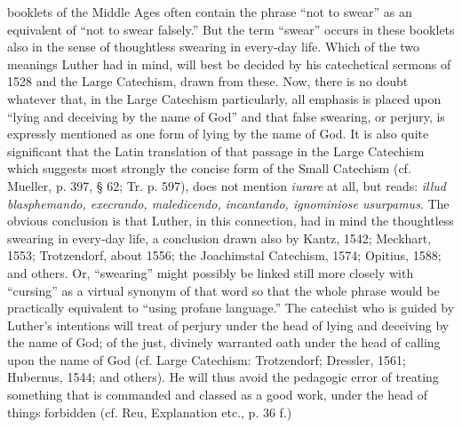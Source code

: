 booklets of the Middle Ages often contain the phrase “not to swear” as an equivalent of “not to swear falsely.” But the term “swear” occurs in these booklets also in the sense of thoughtless swearing in every-day life. Which of the two meanings Luther had in mind, will best be decided by his catechetical sermons of 1528 and the Large Catechism, drawn from these. Now, there is no doubt whatever that, in the Large Catechism particularly, all emphasis is placed upon “lying and deceiving by the name of God” and that false swearing, or perjury, is expressly mentioned as one form of lying by the name of God. It is also quite significant that the Latin translation of that passage in the Large Catechism which suggests most strongly the concise form of the Small Catechism (cf. Mueller, p. 397, § 62; Tr. p. 597), does not mention \emph{iurare} at all, but reads: \emph{illud blasphemando, execrando, maledicendo, incantando, ignominiose usurpamus}. The obvious conclusion is that Luther, in this connection, had in mind the thoughtless swearing in every-day life, a conclusion drawn also by Kantz, 1542; Meckhart, 1553; Trotzendorf, about 1556; the Joachimstal Catechism, 1574; Opitius, 1588; and others. Or, “swearing” might possibly be linked still more closely with “cursing” as a virtual synonym of that word so that the whole phrase would be practically equivalent to “using profane language.” The catechist who is guided by Luther’s intentions will treat of perjury under the head of lying and deceiving by the name of God; of the just, divinely warranted oath under the head of calling upon the name of God (cf. Large Catechism: Trotzendorf; Dressler, 1561; Hubernus, 1544; and others). He will thus avoid the pedagogic error of treating something that is commanded and classed as a good work, under the head of things forbidden (cf. Reu, Explanation etc., p. 36 f.)

